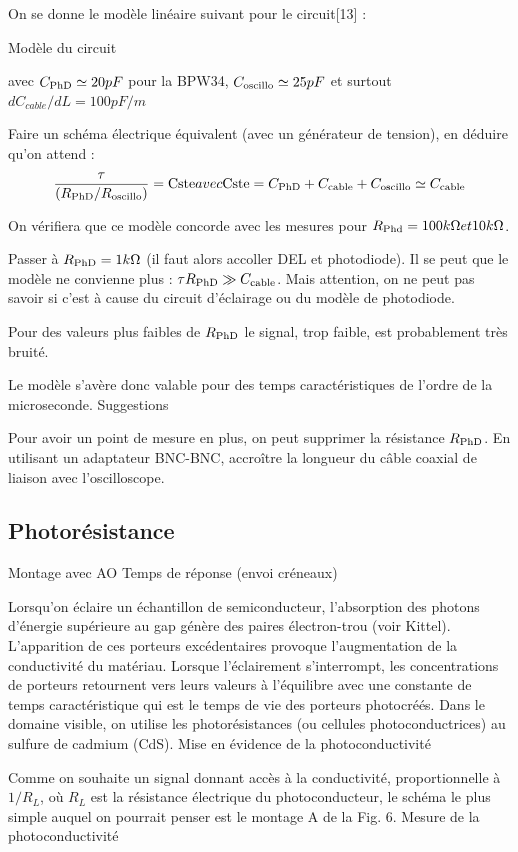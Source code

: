 \documentclass{article}%
\begin{document}
On se donne le modèle linéaire suivant pour le circuit[13] :


Modèle du circuit

avec $ C_{\rm PhD} \simeq 20 pF$ pour la BPW34, $ C_{\rm oscillo} \simeq 25 pF$ et surtout $ d C_{cable}/d L = 100 pF/m$

Faire un schéma électrique équivalent (avec un générateur de tension), en déduire qu'on attend :
\[ \frac{\tau}{(R_{\rm PhD} / R_{\rm oscillo})} ={\rm Cste} avec {\rm Cste}=C_{\rm PhD} +C_{\rm cable} + C_{\rm oscillo} \simeq C_{\rm cable}\]

On vérifiera que ce modèle concorde avec les mesures pour $ R_{\rm Phd} = 100 k\Omega et 10 k\Omega$.

Passer à $R_{\rm PhD} = 1 k\Omega$ (il faut alors accoller DEL et photodiode). Il se peut que le modèle ne convienne plus : $\tau  R_{\rm PhD}\gg C_{\rm cable}$. Mais attention, on ne peut pas savoir si c'est à cause du circuit d'éclairage ou du modèle de photodiode.

Pour des valeurs plus faibles de $R_{\rm PhD}$ le signal, trop faible, est probablement très bruité.

Le modèle s'avère donc valable pour des temps caractéristiques de l'ordre de la microseconde.
Suggestions

    Pour avoir un point de mesure en plus, on peut supprimer la résistance $ R_{\rm PhD}$.
    En utilisant un adaptateur BNC-BNC, accroître la longueur du câble coaxial de liaison avec l'oscilloscope.

\subsection{Photorésistance}
Montage avec AO
Temps de réponse (envoi créneaux)

Lorsqu'on éclaire un échantillon de semiconducteur, l'absorption des photons d'énergie supérieure au gap génère des paires électron-trou (voir Kittel). L'apparition de ces porteurs excédentaires provoque l'augmentation de la conductivité du matériau. Lorsque l'éclairement s'interrompt, les concentrations de porteurs retournent vers leurs valeurs à l'équilibre avec une constante de temps caractéristique qui est le temps de vie des porteurs photocréés. Dans le domaine visible, on utilise les photorésistances (ou cellules photoconductrices) au sulfure de cadmium (CdS).
Mise en évidence de la photoconductivité

Comme on souhaite un signal donnant accès à la conductivité, proportionnelle à $1/R_L$, où $R_L$ est la résistance électrique du photoconducteur, le schéma le plus simple auquel on pourrait penser est le montage A de la Fig. 6.
Mesure de la photoconductivité
\end{document}
